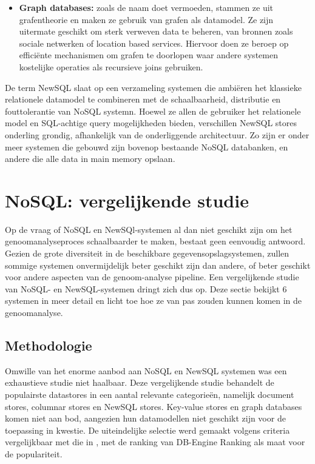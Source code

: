 \begin{itemize}
\item \textbf{Graph databases:} zoals de naam doet vermoeden, stammen ze uit grafentheorie en maken ze gebruik van grafen als datamodel. Ze zijn uitermate geschikt om sterk verweven data te beheren, van bronnen zoals sociale netwerken of location based services. Hiervoor doen ze beroep op effici\"ente mechanismen om grafen te doorlopen waar andere systemen kostelijke operaties als recursieve joins gebruiken\cite{hecht2011nosql}.

\end{itemize}

De term NewSQL slaat op een verzameling systemen die ambi\"eren het klassieke relationele datamodel te combineren met de schaalbaarheid, distributie en fouttolerantie van NoSQL systemn. Hoewel ze allen de gebruiker het relationele model en SQL-achtige query mogelijkheden bieden, verschillen NewSQL stores onderling grondig, afhankelijk van de onderliggende architectuur. Zo zijn er onder meer systemen die gebouwd zijn bovenop bestaande NoSQL databanken, en andere die alle data in main memory opslaan.\cite{grolinger2013data}

\section{NoSQL: vergelijkende studie}
\label{nosql_survey}

Op de vraag of NoSQL en NewSQl-systemen al dan niet geschikt zijn om het genoomanalyseproces schaalbaarder te maken, bestaat geen eenvoudig antwoord. Gezien de grote diversiteit in de beschikbare gegevensopslagsystemen, zullen sommige systemen onvermijdelijk beter geschikt zijn dan andere, of beter geschikt voor andere aspecten van de genoom-analyse pipeline. Een vergelijkende studie van NoSQL- en NewSQL-systemen dringt zich dus op. Deze sectie bekijkt 6 systemen in meer detail en licht toe hoe ze van pas zouden kunnen komen in de genoomanalyse.

\subsection{Methodologie}

Omwille van het enorme aanbod aan NoSQL en NewSQL systemen was een exhaustieve studie niet haalbaar. Deze vergelijkende studie behandelt de populairste datastores in een aantal relevante categorie\"en, namelijk document stores, columnar stores en NewSQL stores. Key-value stores en graph databases komen niet aan bod, aangezien hun datamodellen niet geschikt zijn voor de toepassing in kwestie. De uiteindelijke selectie werd gemaakt volgens criteria vergelijkbaar met die in \cite{grolinger2013data}, met de ranking van DB-Engine Ranking \cite{db_engine_rank} als maat voor de populariteit.\\

